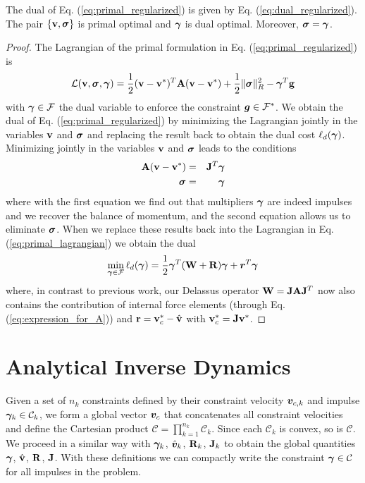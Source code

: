 \begin{theorem}
The dual of Eq. (\ref{eq:primal_regularized}) is given by Eq.
(\ref{eq:dual_regularized}). The pair $\{{\mathbf{v}},{\bm\sigma}\}$ is primal optimal and
${\bm\gamma}$ is dual optimal. Moreover, ${\bm\sigma} = {\bm\gamma}$.
\end{theorem}

\begin{proof}
The Lagrangian of the primal formulation in Eq. (\ref{eq:primal_regularized}) is
\begin{equation}
	\mathcal{L}(\mf{v},\bsigma,\vf{\gamma}) = \frac{1}{2}(\mf{v}-\mf{v}^*)^T\mf{A}(\mf{v}-\mf{v}^*) + \frac{1}{2} \Vert\bsigma\Vert_{R}^2 - \vf{\gamma}^T\mf{g}
	\label{eq:primal_lagrangian}
\end{equation}
with ${\bm{\gamma}}\in\mathcal{F}$ the dual variable to enforce the constraint
${\bm{g}}\in \mathcal{F}^*$. We obtain the dual of Eq.
(\ref{eq:primal_regularized}) by minimizing the Lagrangian jointly in the
variables ${\mathbf{v}}$ and ${\bm\sigma}$ and replacing the result back to obtain the
dual cost $\ell_d({\bm{\gamma}})$. Minimizing jointly in the variables ${\mathbf{v}}$
and ${\bm\sigma}$ leads to the conditions
\begin{eqnarray}
	{\mathbf{A}}({\mathbf{v}}-{\mathbf{v}}^*) &=& {\mathbf{J}}^T{\bm{\gamma}}\\
	{\bm{\sigma}} &=& {\bm{\gamma}}
\end{eqnarray}
where with the first equation we find out that multipliers ${\bm\gamma}$ are indeed
impulses and we recover the balance of momentum, and the second equation allows
us to eliminate ${\bm{\sigma}}$. When we replace these results back into the
Lagrangian in Eq. (\ref{eq:primal_lagrangian}) we obtain the dual
\begin{eqnarray}
	\min_{{\bm\gamma}\in \mathcal{F}} \ell_d({\bm\gamma}) =
	\frac{1}{2}{\bm\gamma}^T(\mathbf{W}+\mathbf{R}){\bm\gamma} + {\bm r}^T
	{\bm\gamma}
\end{eqnarray}
where, in contrast to previous work, our Delassus operator
${\mathbf{W}}={\mathbf{J}}{\mathbf{A}}{\mathbf{J}}^T$ now also contains the contribution of internal
force elements (through Eq. (\ref{eq:expression_for_A})) and
${\mathbf{r}}={\mathbf{v}}_c^*-\hat{{\mathbf{v}}}$ with ${\mathbf{v}}_c^*={\mathbf{J}}{\mathbf{v}}^*$.
\end{proof}

\section{Analytical Inverse Dynamics}
\label{sec:analytical_inverse_dynamics}

Given a set of $n_k$ constraints defined by their constraint velocity
${\bm{v}}_{c,k}$ and impulse ${\bm\gamma}_k\in\mathcal{C}_k$, we form a global vector
${\bm{v}}_c$ that concatenates all constraint velocities and define the Cartesian
product $\mathcal{C}=\prod_{k=1}^{n_k}\mathcal{C}_k$. Since each $\mathcal{C}_k$
is convex, so is $\mathcal{C}$. We proceed in a similar way with ${\bm\gamma}_k$,
$\hat{{\bm{v}}}_k$, ${\mathbf{R}}_k$, ${\mathbf{J}}_k$ to obtain the global quantities
${\bm\gamma}$, $\hat{{\mathbf{v}}}$, ${\mathbf{R}}$, ${\mathbf{J}}$. With these definitions we can
compactly write the constraint ${\bm\gamma}\in\mathcal{C}$ for all impulses in the
problem.


